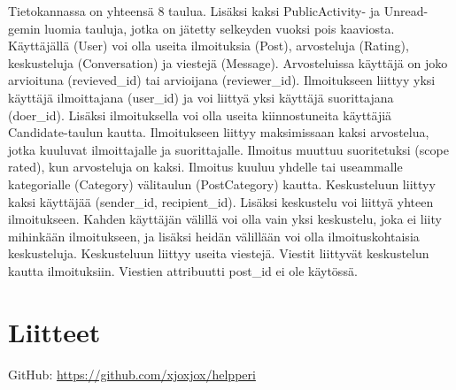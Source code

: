 \documentclass[a4paper,12pt, titlepage]{article}
\begin{document}
\noindent{}
\newline
\newline
\newline
\newline
Tietokannassa on yhteensä 8 taulua. Lisäksi kaksi PublicActivity- ja Unread-gemin luomia tauluja, jotka on jätetty selkeyden vuoksi pois kaaviosta.
\newline
Käyttäjällä (User) voi olla useita ilmoituksia (Post), arvosteluja (Rating), keskusteluja (Conversation) ja viestejä (Message). Arvosteluissa käyttäjä on joko arvioituna (revieved\_id) tai arvioijana (reviewer\_id).
\newline
Ilmoitukseen liittyy yksi käyttäjä ilmoittajana (user\_id) ja voi liittyä yksi käyttäjä suorittajana (doer\_id). Lisäksi ilmoituksella voi olla useita kiinnostuneita käyttäjiä Candidate-taulun kautta. Ilmoitukseen liittyy maksimissaan kaksi arvostelua, jotka kuuluvat ilmoittajalle ja suorittajalle. Ilmoitus muuttuu suoritetuksi (scope rated), kun arvosteluja on kaksi. Ilmoitus kuuluu yhdelle tai useammalle kategorialle (Category) välitaulun (PostCategory) kautta.
\newline
Keskusteluun liittyy kaksi käyttäjää (sender\_id, recipient\_id). Lisäksi keskustelu voi liittyä yhteen ilmoitukseen. Kahden käyttäjän välillä voi olla vain yksi keskustelu, joka ei liity mihinkään ilmoitukseen, ja lisäksi heidän välillään voi olla ilmoituskohtaisia keskusteluja. Keskusteluun liittyy useita viestejä. Viestit liittyvät keskustelun kautta ilmoituksiin. Viestien attribuutti post\_id ei ole käytössä. 

\section{Liitteet}

GitHub:
\url{https://github.com/xjoxjox/helpperi}
\end{document}
